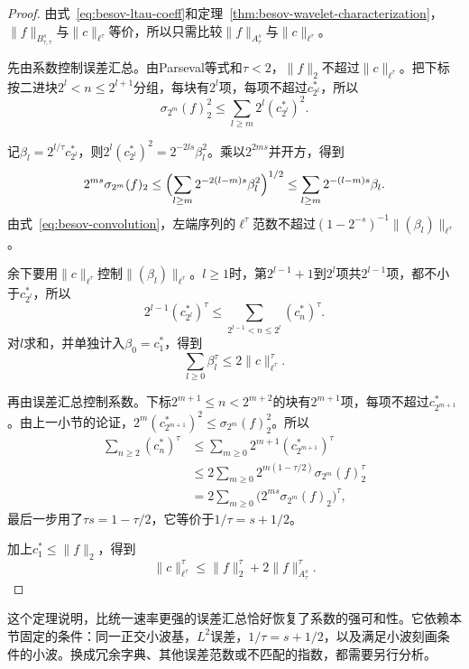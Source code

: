 \begin{proof}
由式~\eqref{eq:besov-ltau-coeff}和定理~\ref{thm:besov-wavelet-characterization}，$\lVert f\rVert_{B^s_{\tau,\tau}}$与$\lVert c\rVert_{\ell^\tau}$等价，所以只需比较$\lVert f\rVert_{A^s_\tau}$与$\lVert c\rVert_{\ell^\tau}$。

先由系数控制误差汇总。由Parseval等式和$\tau<2$，$\lVert f\rVert_2$不超过$\lVert c\rVert_{\ell^\tau}$。把下标按二进块$2^l<n\leq2^{l+1}$分组，每块有$2^l$项，每项不超过$c_{2^l}^*$，所以
\[
 \sigma_{2^m}(f)_2^2\leq\sum_{l\geq m}2^l(c_{2^l}^*)^2 .
\]

记$\beta_l=2^{l/\tau}c_{2^l}^*$，则$2^l(c_{2^l}^*)^2=2^{-2ls}\beta_l^2$。乘以$2^{2ms}$并开方，得到
\[
 2^{ms}\sigma_{2^m}(f)_2\leq\Bigl(\sum_{l\geq m}2^{-2(l-m)s}\beta_l^2\Bigr)^{1/2}\leq\sum_{l\geq m}2^{-(l-m)s}\beta_l .
\]
由式~\eqref{eq:besov-convolution}，左端序列的$\ell^\tau$范数不超过$(1-2^{-s})^{-1}\lVert(\beta_l)\rVert_{\ell^\tau}$。

余下要用$\lVert c\rVert_{\ell^\tau}$控制$\lVert(\beta_l)\rVert_{\ell^\tau}$。$l\geq1$时，第$2^{l-1}+1$到$2^l$项共$2^{l-1}$项，都不小于$c_{2^l}^*$，所以
\[
 2^{l-1}(c_{2^l}^*)^\tau\leq\sum_{2^{l-1}<n\leq2^l}(c_n^*)^\tau .
\]
对$l$求和，并单独计入$\beta_0=c_1^*$，得到
\[
 \sum_{l\geq0}\beta_l^\tau\leq2\lVert c\rVert_{\ell^\tau}^\tau .
\]

再由误差汇总控制系数。下标$2^{m+1}\leq n<2^{m+2}$的块有$2^{m+1}$项，每项不超过$c_{2^{m+1}}^*$。由上一小节的论证，$2^m(c_{2^{m+1}}^*)^2\leq\sigma_{2^m}(f)_2^2$。所以
\[
 \begin{aligned}
 \sum_{n\geq2}(c_n^*)^\tau&\leq\sum_{m\geq0}2^{m+1}(c_{2^{m+1}}^*)^\tau\\
 &\leq2\sum_{m\geq0}2^{m(1-\tau/2)}\sigma_{2^m}(f)_2^\tau\\
 &=2\sum_{m\geq0}\bigl(2^{ms}\sigma_{2^m}(f)_2\bigr)^\tau ,
 \end{aligned}
\]
最后一步用了$\tau s=1-\tau/2$，它等价于$1/\tau=s+1/2$。

加上$c_1^*\leq\lVert f\rVert_2$，得到
\[
 \lVert c\rVert_{\ell^\tau}^\tau\leq\lVert f\rVert_2^\tau+2\lVert f\rVert_{A^s_\tau}^\tau .
\]
\end{proof}

这个定理说明，比统一速率更强的误差汇总恰好恢复了系数的强可和性。它依赖本节固定的条件：同一正交小波基，$L^2$误差，$1/\tau=s+1/2$，以及满足小波刻画条件的小波。换成冗余字典、其他误差范数或不匹配的指数，都需要另行分析。
